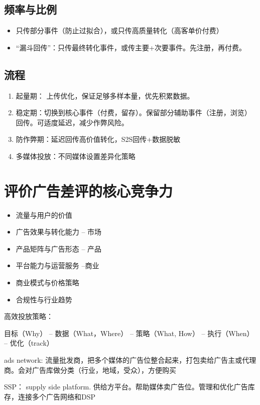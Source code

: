 \documentclass{article}
\begin{document}
\subsection{频率与比例}
\begin{itemize}
    \item 只传部分事件（防止过拟合），或只传高质量转化（高客单价付费）
    \item “漏斗回传”：只传最终转化事件，或传主要+次要事件。先注册，再付费。
\end{itemize}

\subsection{流程}
\begin{enumerate}
    \item 起量期： 上传优化，保证足够多样本量，优先积累数据。
    \item 稳定期：切换到核心事件（付费，留存）。保留部分辅助事件（注册，浏览）回传。可适度延迟，减少作弊风险。
    \item 防作弊期：延迟回传高价值转化，S2S回传+数据脱敏
    \item 多媒体投放：不同媒体设置差异化策略
\end{enumerate}


\section{评价广告差评的核心竞争力}
\begin{itemize}
    \item 流量与用户的价值
    \item 广告效果与转化能力 -- 市场
    \item 产品矩阵与广告形态 -- 产品
    \item 平台能力与运营服务 --商业
    \item 商业模式与价格策略
    \item 合规性与行业趋势
\end{itemize}

高效投放策略： 

目标（Why） -- 数据（What，Where） -- 策略（What, How） -- 执行（When） -- 优化（track）

ads network: 流量批发商，把多个媒体的广告位整合起来，打包卖给广告主或代理商。会对广告库做分类（行业，地域，受众），方便购买

SSP： supply side platform.  供给方平台。帮助媒体卖广告位。管理和优化广告库存，连接多个广告网络和DSP
\end{document}
